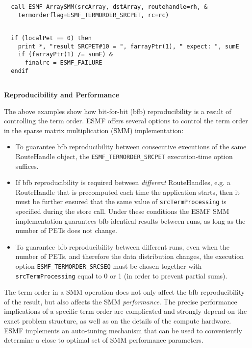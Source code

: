  \begin{verbatim}
  call ESMF_ArraySMM(srcArray, dstArray, routehandle=rh, &
    termorderflag=ESMF_TERMORDER_SRCPET, rc=rc)
 
\end{verbatim}
 

 \begin{verbatim}
  if (localPet == 0) then
    print *, "result SRCPET#10 = ", farrayPtr(1), " expect: ", sumE
    if (farrayPtr(1) /= sumE) &
      finalrc = ESMF_FAILURE
  endif
 
\end{verbatim}
 

   {\bf Reproducibility and Performance}
  
   The above examples show how bit-for-bit (bfb) reproducibility is a result of
   controlling the term order. ESMF offers several options to control the term
   order in the sparse matrix multiplication (SMM) implementation:
   \begin{sloppypar}
   \begin{itemize}
   \item To guarantee bfb reproducibility between consecutive executions of the
   same RouteHandle object, the {\tt ESMF\_TERMORDER\_SRCPET} execution-time 
   option suffices.
   \item If bfb reproducibility is required between {\em different} RouteHandles, 
   e.g. a RouteHandle that is precomputed each time the application starts, 
   then it must be further ensured that the same value of {\tt srcTermProcessing}
   is specified during the store call. Under these conditions the ESMF SMM 
   implementation guarantees bfb identical results between runs, as long as the
   number of PETs does not change.
   \item To guarantee bfb reproducibility between different runs, even when the
   number of PETs, and therefore the data distribution changes, the execution
   option {\tt ESMF\_TERMORDER\_SRCSEQ} must be chosen together with
   {\tt srcTermProcessing} equal to 0 or 1 (in order to prevent partial sums).
   \end{itemize}
   \end{sloppypar}
  
   The term order in a SMM operation does not only affect the bfb
   reproducibility of the result, but also affects the SMM {\em performance}. 
   The precise performance implications of a specific term order are
   complicated and strongly depend on the exact problem structure, as well as
   on the details of the compute hardware. ESMF implements an auto-tuning 
   mechanism that can be used to conveniently determine a close to optimal set
   of SMM performance parameters.
  
